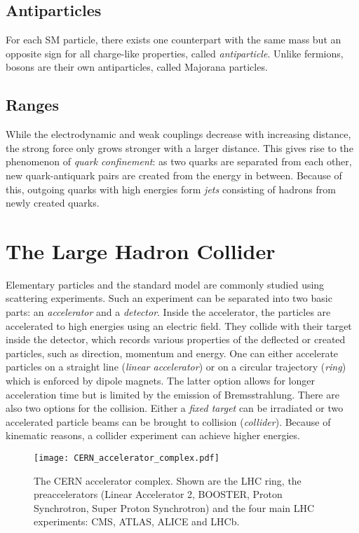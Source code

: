 \subsection{Antiparticles}
For each SM particle, there exists one counterpart with the same mass but an opposite sign for all charge-like properties, called \emph{antiparticle}. Unlike fermions, bosons are their own antiparticles, called Majorana particles.

\subsection{Ranges}
While the electrodynamic and weak couplings decrease with increasing distance, the strong force only grows stronger with a larger distance. This gives rise to the phenomenon of \emph{quark confinement}: as two quarks are separated from each other, new quark-antiquark pairs are created from the energy in between. Because of this, outgoing quarks with high energies form \emph{jets} consisting of hadrons from newly created quarks.

\section{The Large Hadron Collider}
Elementary particles and the standard model are commonly studied using scattering experiments. Such an experiment can be separated into two basic parts: an \emph{accelerator} and a \emph{detector}.
Inside the accelerator, the particles are accelerated to high energies using an electric field. They collide with their target inside the detector, which records various properties of the deflected or created particles, such as direction, momentum and energy. 
One can either accelerate particles on a straight line (\emph{linear accelerator}) or on a circular trajectory (\emph{ring}) which is enforced by dipole magnets. The latter option allows for longer acceleration time but is limited by the emission of Bremsstrahlung.
There are also two options for the collision. Either a \emph{fixed target} can be irradiated or two accelerated particle beams can be brought to collision (\emph{collider}). Because of kinematic reasons, a collider experiment can achieve higher energies.

\begin{figure}[htbp]
	\centering
	\texttt{[image: CERN\_accelerator\_complex.pdf]}
	\caption{The CERN accelerator complex\cite[modified]{Marcastel2013CERNs}. Shown are the LHC ring, the preaccelerators (Linear Accelerator 2, BOOSTER, Proton Synchrotron, Super Proton Synchrotron) and the four main LHC experiments: CMS, ATLAS, ALICE and LHCb.}
	\label{fig:cern_accelerator_complex}
\end{figure}

